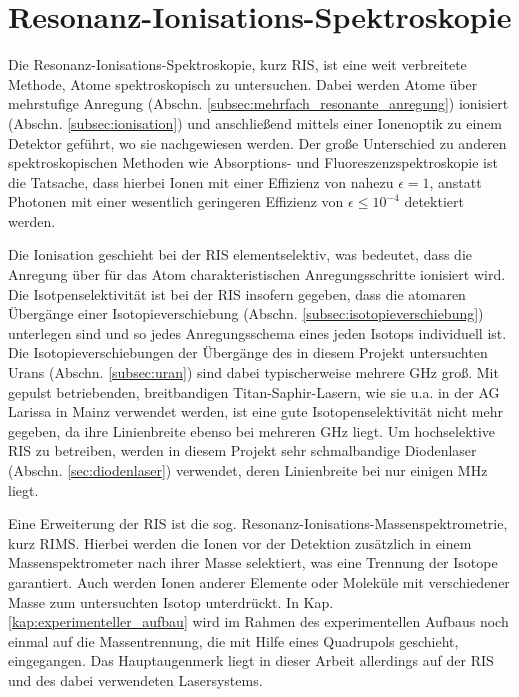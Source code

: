 \section{Resonanz-Ionisations-Spektroskopie}\label{sec:ris}
Die Resonanz-Ionisations-Spektroskopie, kurz RIS, ist eine weit verbreitete
Methode, Atome spektroskopisch zu untersuchen. Dabei werden Atome über
mehrstufige Anregung (Abschn. \ref{subsec:mehrfach_resonante_anregung})
ionisiert (Abschn. \ref{subsec:ionisation}) und anschließend mittels
einer Ionenoptik zu einem Detektor geführt, wo sie nachgewiesen werden. Der große Unterschied zu anderen spektroskopischen Methoden wie Absorptions- und Fluoreszenzspektroskopie ist die
Tatsache, dass hierbei Ionen mit einer Effizienz von nahezu $\epsilon=1$,
anstatt Photonen mit einer wesentlich geringeren Effizienz von
$\epsilon\leq10^{-4}$ detektiert werden.\par
Die Ionisation geschieht bei der RIS elementselektiv, was bedeutet, dass die
Anregung über für das Atom charakteristischen Anregungsschritte ionisiert wird.
Die Isotpenselektivität ist bei der RIS insofern gegeben, dass die atomaren
Übergänge einer Isotopieverschiebung (Abschn. \ref{subsec:isotopieverschiebung})
unterlegen sind und so jedes Anregungsschema eines jeden Isotops individuell
ist. Die Isotopieverschiebungen der Übergänge des in diesem Projekt
untersuchten Urans (Abschn. \ref{subsec:uran}) sind dabei typischerweise mehrere
GHz groß. Mit gepulst betriebenden, breitbandigen
Titan-Saphir-Lasern, wie sie u.a. in der AG Larissa in Mainz verwendet werden,
ist eine gute Isotopenselektivität nicht mehr gegeben, da ihre Linienbreite
ebenso bei mehreren GHz liegt. Um hochselektive RIS zu betreiben,
werden in diesem Projekt sehr schmalbandige Diodenlaser
(Abschn. \ref{sec:diodenlaser}) verwendet, deren Linienbreite bei nur einigen
MHz liegt.\par
Eine Erweiterung der RIS ist die sog. Resonanz-Ionisations-Massenspektrometrie,
kurz RIMS. Hierbei werden die Ionen vor der Detektion zusätzlich in einem
Massenspektrometer nach ihrer Masse selektiert, was eine Trennung der Isotope
garantiert. Auch werden Ionen anderer Elemente oder Moleküle mit verschiedener
Masse zum untersuchten Isotop unterdrückt. In Kap.
\ref{kap:experimenteller_aufbau} wird im Rahmen des experimentellen Aufbaus noch
einmal auf die Massentrennung, die mit Hilfe eines Quadrupols geschieht,
eingegangen. Das Hauptaugenmerk liegt in dieser Arbeit allerdings auf der RIS
und des dabei verwendeten Lasersystems.

